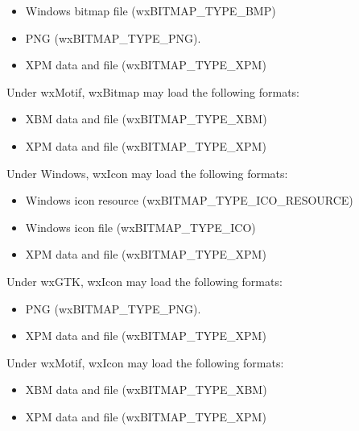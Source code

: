 \begin{itemize}\itemsep=0pt
\item Windows bitmap file (wxBITMAP\_TYPE\_BMP)
\item PNG (wxBITMAP\_TYPE\_PNG).
\item XPM data and file (wxBITMAP\_TYPE\_XPM)
\end{itemize}

Under wxMotif, wxBitmap may load the following formats:

\begin{itemize}\itemsep=0pt
\item XBM data and file (wxBITMAP\_TYPE\_XBM)
\item XPM data and file (wxBITMAP\_TYPE\_XPM)
\end{itemize}


Under Windows, wxIcon may load the following formats:

\begin{itemize}\itemsep=0pt
\item Windows icon resource (wxBITMAP\_TYPE\_ICO\_RESOURCE)
\item Windows icon file (wxBITMAP\_TYPE\_ICO)
\item XPM data and file (wxBITMAP\_TYPE\_XPM)
\end{itemize}

Under wxGTK, wxIcon may load the following formats:

\begin{itemize}\itemsep=0pt
\item PNG (wxBITMAP\_TYPE\_PNG).
\item XPM data and file (wxBITMAP\_TYPE\_XPM)
\end{itemize}

Under wxMotif, wxIcon may load the following formats:

\begin{itemize}\itemsep=0pt
\item XBM data and file (wxBITMAP\_TYPE\_XBM)
\item XPM data and file (wxBITMAP\_TYPE\_XPM)
\end{itemize}

